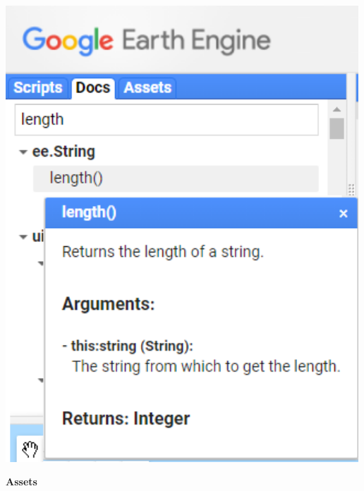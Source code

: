 \documentclass[
]{article}
\begin{document}
\includegraphics[width=500px]{Img/doc_ejemplo}

\textbf{Assets}
\end{document}
